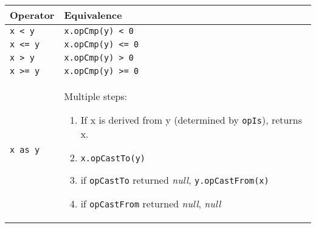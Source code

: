 \begin{longtable}{ | l | X | }
\hline
\textbf{Operator} & \textbf{Equivalence} \\
\hline\hline
\texttt{x < y} & \texttt{x.opCmp(y) < 0} \\
\hline
\texttt{x <= y} & \texttt{x.opCmp(y) <= 0} \\
\hline
\texttt{x > y} & \texttt{x.opCmp(y) > 0} \\
\hline
\texttt{x >= y} & \texttt{x.opCmp(y) >= 0} \\
\hline
\texttt{x as y} &
Multiple steps:
\begin{enumerate}
\item If x is derived from y (determined by \texttt{opIs}), returns x.
\item \texttt{x.opCastTo(y)}
\item if \texttt{opCastTo} returned \textit{null}, \texttt{y.opCastFrom(x)}
\item if \texttt{opCastFrom} returned \textit{null}, \textit{null}
\end{enumerate} \\
\hline
\end{longtable}
